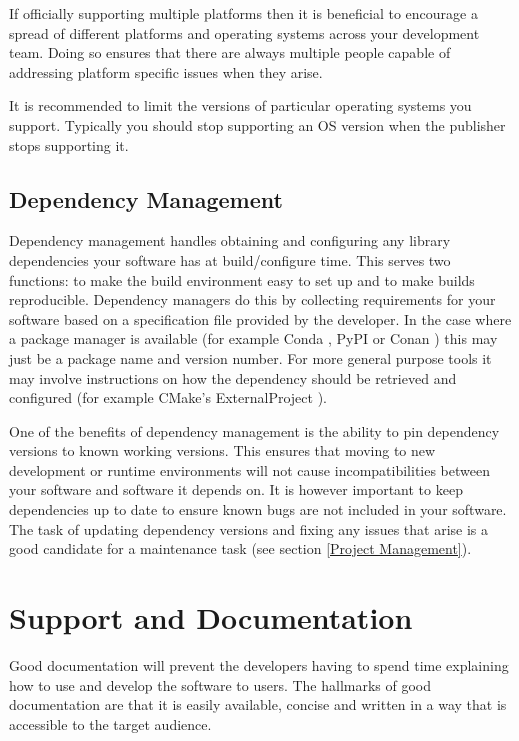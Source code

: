 \documentclass[jnr]{iosart2x}
\begin{document}
\begin{itemzie}
If officially supporting multiple platforms then it is beneficial to encourage a spread of different platforms and operating systems across your development team.
Doing so ensures that there are always multiple people capable of addressing platform specific issues when they arise.

It is recommended to limit the versions of particular operating systems you support.
Typically you should stop supporting an OS version when the publisher stops supporting it.

\subsection{Dependency Management}
\label{Dependency Management}

Dependency management handles obtaining and configuring any library dependencies your software has at build/configure time.
This serves two functions: to make the build environment easy to set up and to make builds reproducible.
Dependency managers do this by collecting requirements for your software based on a specification file provided by the developer.
In the case where a package manager is available (for example Conda \cite{Conda}, PyPI \cite{PyPI} or Conan \cite{Conan}) this may just be a package name and version number.
For more general purpose tools it may involve instructions on how the dependency should be retrieved and configured (for example CMake's ExternalProject \cite{CMake_ExternalProject}).

One of the benefits of dependency management is the ability to pin dependency versions to known working versions.
This ensures that moving to new development or runtime environments will not cause incompatibilities between your software and software it depends on.
It is however important to keep dependencies up to date to ensure known bugs are not included in your software.
The task of updating dependency versions and fixing any issues that arise is a good candidate for a maintenance task (see section \ref{Project Management}).

\section{Support and Documentation}
\label{Support and Documentation}

Good documentation will prevent the developers having to spend time explaining how to use and develop the software to users.
The hallmarks of good documentation are that it is easily available, concise and written in a way that is accessible to the target audience.


\end{itemzie}
\end{document}
